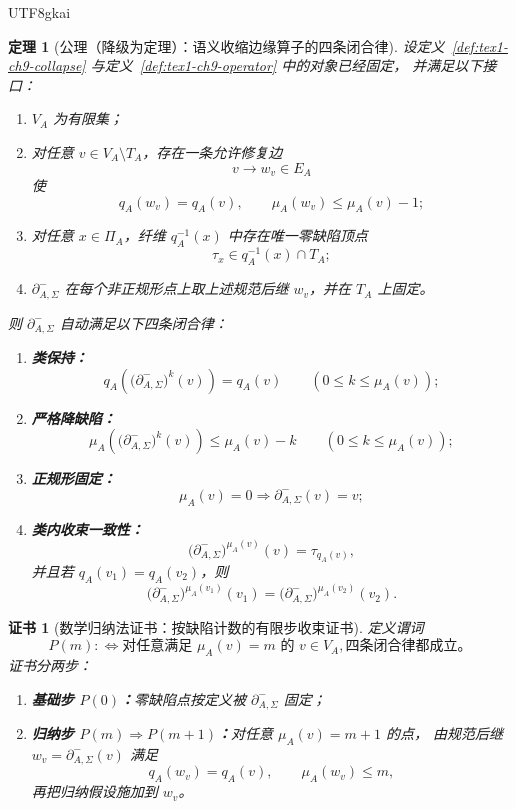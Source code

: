 \documentclass[12pt]{article}
\newtheorem{theorem}{定理}[section]
\newtheorem{Certificate}{证书}[section]
\begin{document}
\begin{CJK*}{UTF8}{gkai}
\begin{theorem}[公理（降级为定理）：语义收缩边缘算子的四条闭合律]
\label{thm:tex1-ch9-axiom-downgraded}
设定义~\ref{def:tex1-ch9-collapse} 与定义~\ref{def:tex1-ch9-operator} 中的对象已经固定，
并满足以下接口：
\begin{enumerate}
  \item \(V_A\) 为有限集；
  \item 对任意 \(v\in V_A\setminus T_A\)，存在一条允许修复边
  \[
    v\to w_v\in E_A
  \]
  使
  \[
    q_A(w_v)=q_A(v),
    \qquad
    \mu_A(w_v)\le \mu_A(v)-1;
  \]
  \item 对任意 \(x\in \Pi_A\)，纤维 \(q_A^{-1}(x)\) 中存在唯一零缺陷顶点
  \[
    \tau_x\in q_A^{-1}(x)\cap T_A;
  \]
  \item \(\partial^-_{A,\Sigma}\) 在每个非正规形点上取上述规范后继 \(w_v\)，并在 \(T_A\) 上固定。
\end{enumerate}
则 \(\partial^-_{A,\Sigma}\) 自动满足以下四条闭合律：
\begin{enumerate}
  \item \textbf{类保持：}
  \[
    q_A\!\left(
      \bigl(\partial^-_{A,\Sigma}\bigr)^k(v)
    \right)=q_A(v)
    \qquad
    (0\le k\le \mu_A(v));
  \]
  \item \textbf{严格降缺陷：}
  \[
    \mu_A\!\left(
      \bigl(\partial^-_{A,\Sigma}\bigr)^k(v)
    \right)
    \le
    \mu_A(v)-k
    \qquad
    (0\le k\le \mu_A(v));
  \]
  \item \textbf{正规形固定：}
  \[
    \mu_A(v)=0
    \Rightarrow
    \partial^-_{A,\Sigma}(v)=v;
  \]
  \item \textbf{类内收束一致性：}
  \[
    \bigl(\partial^-_{A,\Sigma}\bigr)^{\mu_A(v)}(v)=\tau_{q_A(v)},
  \]
  并且若 \(q_A(v_1)=q_A(v_2)\)，则
  \[
    \bigl(\partial^-_{A,\Sigma}\bigr)^{\mu_A(v_1)}(v_1)
    =
    \bigl(\partial^-_{A,\Sigma}\bigr)^{\mu_A(v_2)}(v_2).
  \]
\end{enumerate}
\end{theorem}

\begin{Certificate}[数学归纳法证书：按缺陷计数的有限步收束证书]
\label{cert:tex1-ch9-axiom-downgraded}
定义谓词
\[
  P(m)
  :
  \Longleftrightarrow
  \text{对任意满足 }\mu_A(v)=m\text{ 的 }v\in V_A,
  \text{四条闭合律都成立。}
\]
证书分两步：
\begin{enumerate}
  \item \textbf{基础步 \(P(0)\)：}零缺陷点按定义被 \(\partial^-_{A,\Sigma}\) 固定；
  \item \textbf{归纳步 \(P(m)\Rightarrow P(m+1)\)：}对任意 \(\mu_A(v)=m+1\) 的点，
  由规范后继 \(w_v=\partial^-_{A,\Sigma}(v)\) 满足
  \[
    q_A(w_v)=q_A(v),
    \qquad
    \mu_A(w_v)\le m,
  \]
  再把归纳假设施加到 \(w_v\)。
\end{enumerate}
\end{Certificate}


\end{CJK*}
\end{document}
